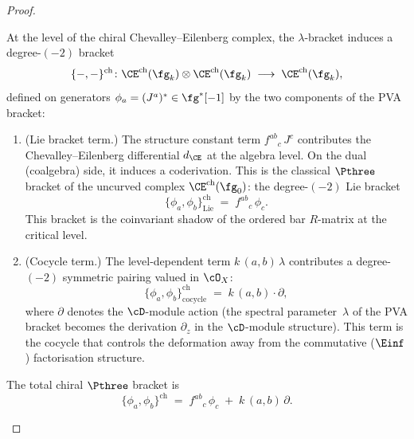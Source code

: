 \begin{proof}
\begin{construction}
At the level of the chiral Chevalley--Eilenberg complex, the
$\lambda$-bracket induces a degree-$(-2)$ bracket
\begin{equation}\label{eq:chiral-p3-def}
  \{-,-\}^{\mathrm{ch}}
  \colon
  \CE^{\mathrm{ch}}(\fg_k)
  \otimes
  \CE^{\mathrm{ch}}(\fg_k)
  \;\longrightarrow\;
  \CE^{\mathrm{ch}}(\fg_k),
\end{equation}
defined on generators $\phi_a = (J^a)^* \in \fg^*[-1]$ by
the two components of the PVA bracket:
\begin{enumerate}[label=\textup{(\roman*)}]
\item \textup{(Lie bracket term.)}
  The structure constant term $f^{ab}{}_c\,J^c$ contributes
  the Chevalley--Eilenberg differential $d_{\CE}$ at the
  algebra level. On the dual (coalgebra) side, it induces a
  coderivation.
  This is the classical $\Pthree$ bracket of the
  uncurved complex $\CE^{\mathrm{ch}}(\fg_0)$: the degree-$(-2)$
  Lie bracket
  \begin{equation}\label{eq:p3-lie-component}
    \{\phi_a, \phi_b\}^{\mathrm{ch}}_{\mathrm{Lie}}
    \;=\;
    f^{ab}{}_c\,\phi_c.
  \end{equation}
  This bracket is the coinvariant shadow of the ordered bar
  $R$-matrix at the critical level.
\item \textup{(Cocycle term.)}
  The level-dependent term $k\,(a,b)\,\lambda$ contributes a
  degree-$(-2)$ symmetric pairing valued in $\cO_X$:
  \begin{equation}\label{eq:p3-cocycle-component}
    \{\phi_a, \phi_b\}^{\mathrm{ch}}_{\mathrm{cocycle}}
    \;=\;
    k\,(a,b) \cdot \partial,
  \end{equation}
  where $\partial$ denotes the $\cD$-module action
  (the spectral parameter~$\lambda$ of the PVA bracket
  becomes the derivation $\partial_z$ in the $\cD$-module
  structure). This term is the cocycle that controls
  the deformation away from the commutative
  ($\Einf$) factorisation structure.
\end{enumerate}

The total chiral $\Pthree$ bracket is
\begin{equation}\label{eq:chiral-p3-total}
  \{\phi_a, \phi_b\}^{\mathrm{ch}}
  \;=\;
  f^{ab}{}_c\,\phi_c
  \;+\;
  k\,(a,b)\,\partial.
\end{equation}
\end{construction}


\end{proof}

